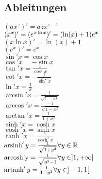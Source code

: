 \documentclass[landscape, 10pt]{article}
\newcommand{\R}{\mathbb{R}}
\begin{document}
\begin{multicols}{3}
\subsection{Ableitungen}
\begin{multicols}{2}
$(ax^z)'=azx^{z-1}$\\
$(x^x)'=(e^{x\ln x})'\\
       =(\ln(x)+1)e^x$\\
$(x\ln x)'=\ln(x)+1$\\
$(e^x)'=e^x$\\
$\sin'x=\cos x$\\
$\cos'x=-\sin x$\\
$\tan'x=\frac{1}{\cos^2x}$\\
$\cot'x=-\frac{1}{\sin^2x}$\\
$\ln'x=\frac{1}{x}$\\
$\arcsin'x=\frac{1}{\sqrt{1-x^2}}$\\
$\arccos'x=\frac{-1}{\sqrt{1-x^2}}$\\
$\arctan'x=\frac{1}{1+x^2}$\\
$\sinh'x=\cosh x$\\
$\cosh'x=\sinh x$\\
$\tanh'x=\frac{1}{\cosh^2x}$\\
$\operatorname{arsinh}'y
        =\frac{1}{\sqrt{1+y^2}}\\
        \forall y\in\R$\\
$\operatorname{arcosh'y}
        =\frac{1}{\sqrt{y^2-1}}\\
        \forall y\in]1,+\infty[$\\
$\operatorname{artanh}'y=\frac{1}{1-y^2}\\
       \forall y\in]-1,1[$
\end{multicols}


\end{multicols}
\end{document}
